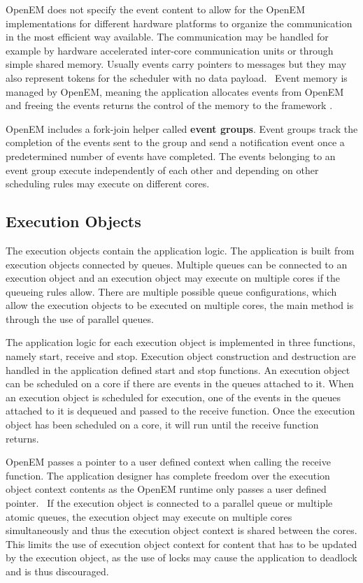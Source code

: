 OpenEM does not specify the event content to allow for the OpenEM implementations for different hardware platforms to organize the communication in the most efficient way available. The communication may be handled for example by hardware accelerated inter-core communication units or through simple shared memory. Usually events carry pointers to messages but they may also represent tokens for the scheduler with no data payload.~\cite{openemintro} Event memory is managed by OpenEM, meaning the application allocates events from OpenEM and freeing the events returns the control of the memory to the framework \cite{openemintro}.

OpenEM includes a fork-join helper called \textbf{event groups}. Event groups track the completion of the events sent to the group and send a notification event once a predetermined number of events have completed. The events belonging to an event group execute independently of each other and depending on other scheduling rules may execute on different cores. \cite{openemintro}

\subsection{Execution Objects}
\label{subsec:eos}
The execution objects contain the application logic. The application is built from execution objects connected by queues. Multiple queues can be connected to an execution object and an execution object may execute on multiple cores if the queueing rules allow. There are multiple possible queue configurations, which allow the execution objects to be executed on multiple cores, the main method is through the use of parallel queues.~\cite{openemintro}

The application logic for each execution object is implemented in three functions, namely start, receive and stop. Execution object construction and destruction are handled in the application defined start and stop functions. An execution object can be scheduled on a core if there are events in the queues attached to it. When an execution object is scheduled for execution, one of the events in the queues attached to it is dequeued and passed to the receive function. Once the execution object has been scheduled on a core, it will run until the receive function returns.~\cite{openemintro}

OpenEM passes a pointer to a user defined context when calling the receive function. The application designer has complete freedom over the execution object context contents as the OpenEM runtime only passes a user defined pointer.~\cite{openemintro} If the execution object is connected to a parallel queue or multiple atomic queues, the execution object may execute on multiple cores simultaneously and thus the execution object context is shared between the cores. This limits the use of execution object context for content that has to be updated by the execution object, as the use of locks may cause the application to deadlock and is thus discouraged.


